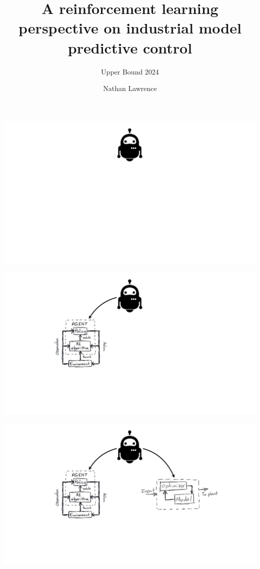\documentclass[
  letterpaper,
  DIV=11,
  numbers=noendperiod,
  oneside]{scrartcl}
\title{A reinforcement learning perspective on industrial model
predictive control}
\subtitle{Upper Bound 2024}
\author{Nathan Lawrence}
\date{}
\begin{document}
\maketitle

\subsection{}\label{section}

\begin{center}
\includegraphics{figs/1_intro_rlmpc.png}
\end{center}

\begin{center}
\includegraphics{figs/2_intro_rlmpc.png}
\end{center}

\begin{center}
\includegraphics{figs/3_intro_rlmpc.png}
\end{center}
\end{document}
